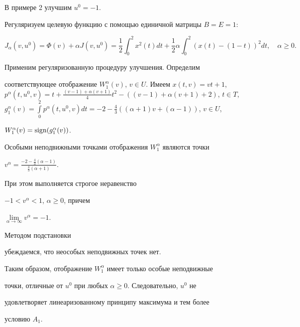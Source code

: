  


\begin{exam} 


В примере 2 улучшим $u^0=-1$. 


Регуляризуем целевую функцию с помощью единичной матрицы $B=E=1$: 


$$ 


J_\alpha(v,u^0)=\Phi(v)+\alpha J(v,u^0)=\frac{1}{2}\int^2_0 


x^2(t)d t+\frac{1}{2}\alpha\int^2_0 


(x(t)-(1-t))^2d t,\quad \alpha\ge0. 


$$ 


 


Применим регуляризованную процедуру улучшения. Определим 


соответствующее отображение $W^\alpha_1(v)$, $v\in U$. Имеем $x(t,v)=v 


t+1$, $p^\alpha(t,u^0,v)=t+\frac{(v-1)+\alpha(v+1)}{4}t^2- 


((v-1)+\alpha(v+1)+2)$, $t\in T$, $g^\alpha_1(v)=\int\limits^2_0 


p^\alpha(t,u^0,v)d t=-2-\frac{4}{3}((\alpha+1)v+(\alpha-1))$, $v\in U$, 


$W^\alpha_1(v)=\operatorname{sign}(g^\alpha_1(v))$. 


 


Особыми неподвижными точками отображения $W^\alpha_1$ являются точки 


$v^\alpha=\frac{-2-\frac{4}{3}(\alpha-1)}{\frac{4}{3}(\alpha+1)}$. 


При этом выполняется строгое неравенство 


$-1<v^\alpha<1$, $\alpha\ge0$, причем


$\lim\limits_{\alpha\to\infty}v^\alpha=-1$. 


Методом подстановки 


убеждаемся, что неособых неподвижных точек нет. 


 


Таким образом, отображение $W^\alpha_1$ имеет только особые неподвижные 


точки, отличные от $u^0$ при любых $\alpha\ge0$. Следовательно, $u^0$ не 


удовлетворяет линеаризованному принципу максимума и тем более 


условию $A_1$. 



\end{exam}

